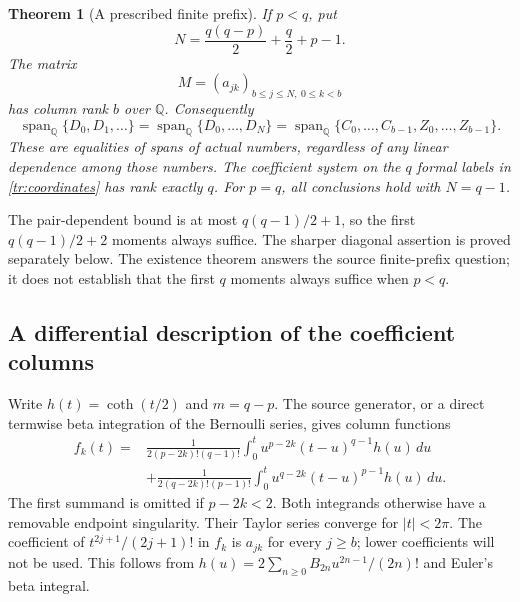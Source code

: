 \documentclass[11pt,a4paper]{article}
\numberwithin{equation}{section}
\newtheorem{theorem}{Theorem}[section]
\theoremstyle{definition}
\begin{document}
\begin{theorem}[A prescribed finite prefix]\label{tr:main}
If $p<q$, put
\begin{equation}\label{tr:N}
 N=\frac{q(q-p)}2+\frac q2+p-1.
\end{equation}
The matrix
\[
 M=(a_{jk})_{b\le j\le N,\ 0\le k<b}
\]
has column rank $b$ over $\mathbb Q$. Consequently
\begin{equation}\label{tr:span}
 \operatorname{span}_{\mathbb Q}\{D_0,D_1,\ldots\}
 =\operatorname{span}_{\mathbb Q}\{D_0,\ldots,D_N\}
 =\operatorname{span}_{\mathbb Q}
     \{C_0,\ldots,C_{b-1},Z_0,\ldots,Z_{b-1}\}.
\end{equation}
These are equalities of spans of actual numbers, regardless of any
linear dependence among those numbers. The coefficient system on the
$q$ formal labels in \eqref{tr:coordinates} has rank exactly $q$.
For $p=q$, all conclusions hold with $N=q-1$.
\end{theorem}

The pair-dependent bound is at most $q(q-1)/2+1$, so the first
$q(q-1)/2+2$ moments always suffice. The sharper diagonal assertion is
proved separately below. The existence theorem answers the source
finite-prefix question; it does not establish that the first $q$ moments
always suffice when $p<q$.

\subsection{A differential description of the coefficient columns}

Write $h(t)=\coth(t/2)$ and $m=q-p$. The source generator, or a direct
termwise beta integration of the Bernoulli series, gives column functions
\begin{equation}\label{tr:column}
 \begin{split}
 f_k(t)={}&
 \frac{1}{2(p-2k)!(q-1)!}
       \int_0^t u^{p-2k}(t-u)^{q-1}h(u)\,du\\
 &+\frac{1}{2(q-2k)!(p-1)!}
       \int_0^t u^{q-2k}(t-u)^{p-1}h(u)\,du.
 \end{split}
\end{equation}
The first summand is omitted if $p-2k<2$. Both integrands otherwise
have a removable endpoint singularity. Their Taylor series converge
for $|t|<2\pi$. The coefficient of $t^{2j+1}/(2j+1)!$ in $f_k$ is
$a_{jk}$ for every $j\ge b$; lower coefficients will not be used.
This follows from $h(u)=2\sum_{n\ge0}B_{2n}u^{2n-1}/(2n)!$ and
Euler's beta integral.
\end{document}
